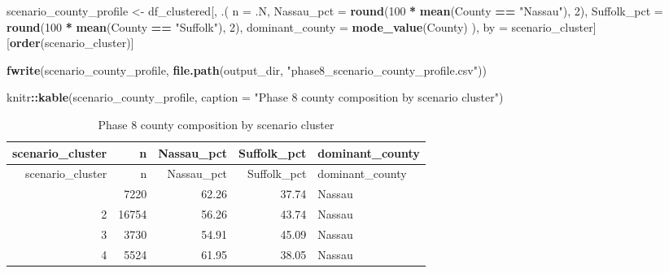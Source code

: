 \documentclass[
]{article}
\newenvironment{Shaded}{\begin{snugshade}}{\end{snugshade}}
\newcommand{\AttributeTok}[1]{\textcolor[rgb]{0.13,0.29,0.53}{#1}}
\newcommand{\DecValTok}[1]{\textcolor[rgb]{0.00,0.00,0.81}{#1}}
\newcommand{\FunctionTok}[1]{\textcolor[rgb]{0.13,0.29,0.53}{\textbf{#1}}}
\newcommand{\NormalTok}[1]{#1}
\newcommand{\OtherTok}[1]{\textcolor[rgb]{0.56,0.35,0.01}{#1}}
\newcommand{\SpecialCharTok}[1]{\textcolor[rgb]{0.81,0.36,0.00}{\textbf{#1}}}
\newcommand{\StringTok}[1]{\textcolor[rgb]{0.31,0.60,0.02}{#1}}
\begin{document}
\begin{Shaded}
\begin{Highlighting}[]
\NormalTok{scenario\_county\_profile }\OtherTok{\textless{}{-}}\NormalTok{ df\_clustered[, .(}
  \AttributeTok{n =}\NormalTok{ .N,}
  \AttributeTok{Nassau\_pct =} \FunctionTok{round}\NormalTok{(}\DecValTok{100} \SpecialCharTok{*} \FunctionTok{mean}\NormalTok{(County }\SpecialCharTok{==} \StringTok{"Nassau"}\NormalTok{), }\DecValTok{2}\NormalTok{),}
  \AttributeTok{Suffolk\_pct =} \FunctionTok{round}\NormalTok{(}\DecValTok{100} \SpecialCharTok{*} \FunctionTok{mean}\NormalTok{(County }\SpecialCharTok{==} \StringTok{"Suffolk"}\NormalTok{), }\DecValTok{2}\NormalTok{),}
  \AttributeTok{dominant\_county =} \FunctionTok{mode\_value}\NormalTok{(County)}
\NormalTok{), by }\OtherTok{=}\NormalTok{ scenario\_cluster][}\FunctionTok{order}\NormalTok{(scenario\_cluster)]}

\FunctionTok{fwrite}\NormalTok{(scenario\_county\_profile, }\FunctionTok{file.path}\NormalTok{(output\_dir, }\StringTok{"phase8\_scenario\_county\_profile.csv"}\NormalTok{))}

\NormalTok{knitr}\SpecialCharTok{::}\FunctionTok{kable}\NormalTok{(scenario\_county\_profile, }\AttributeTok{caption =} \StringTok{"Phase 8 county composition by scenario cluster"}\NormalTok{)}
\end{Highlighting}
\end{Shaded}

\begin{longtable}[]{@{}rrrrl@{}}
\caption{Phase 8 county composition by scenario cluster}\tabularnewline
\toprule\noalign{}
scenario\_cluster & n & Nassau\_pct & Suffolk\_pct & dominant\_county \\
\midrule\noalign{}
\endfirsthead
\toprule\noalign{}
scenario\_cluster & n & Nassau\_pct & Suffolk\_pct & dominant\_county \\
\midrule\noalign{}
\endhead
\bottomrule\noalign{}
\endlastfoot
1 & 7220 & 62.26 & 37.74 & Nassau \\
2 & 16754 & 56.26 & 43.74 & Nassau \\
3 & 3730 & 54.91 & 45.09 & Nassau \\
4 & 5524 & 61.95 & 38.05 & Nassau \\
\end{longtable}
\end{document}
